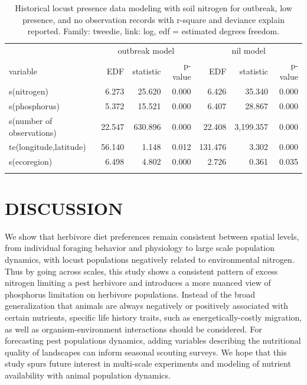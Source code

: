\documentclass[
]{article}
\begin{document}
\begingroup
\fontsize{12.0pt}{14.4pt}\selectfont

\begin{longtable}{lrrrrrr}

\toprule
 & \multicolumn{3}{c}{outbreak model} & \multicolumn{3}{c}{nil model} \\ 
\cmidrule(lr){2-4} \cmidrule(lr){5-7}
variable & EDF & statistic & p-value & EDF & statistic & p-value \\ 
\midrule\addlinespace[2.5pt]
s(nitrogen) & 6.273 & 25.620 & 0.000 & 6.426 & 35.340 & 0.000 \\ 
s(phosphorus) & 5.372 & 15.521 & 0.000 & 6.407 & 28.867 & 0.000 \\ 
s(number of observations) & 22.547 & 630.896 & 0.000 & 22.408 & 3,199.357 & 0.000 \\ 
te(longitude,latitude) & 56.140 & 1.148 & 0.012 & 131.476 & 3.302 & 0.000 \\ 
s(ecoregion) & 6.498 & 4.802 & 0.000 & 2.726 & 0.361 & 0.035 \\ 
\bottomrule

\caption{\label{tbl-spatial-modeling-outbreak-model-results}Historical
locust presence data modeling with soil nitrogen for outbreak, low
presence, and no observation records with r-square and deviance explain
reported. Family: tweedie, link: log, edf = estimated degrees freedom.}

\tabularnewline

\end{longtable}

\endgroup

\section{DISCUSSION}\label{discussion}

We show that herbivore diet preferences remain consistent between
spatial levels, from individual foraging behavior and physiology to
large scale population dynamics, with locust populations negatively
related to environmental nitrogen. Thus by going across scales, this
study shows a consistent pattern of excess nitrogen limiting a pest
herbivore and introduces a more nuanced view of phosphorus limitation on
herbivore populations. Instead of the broad generalization that animals
are always negatively or positively associated with certain nutrients,
specific life history traits, such as energetically-costly migration, as
well as organism-environment interactions should be considered. For
forecasting pest populations dynamics, adding variables describing the
nutritional quality of landscapes can inform seasonal scouting surveys.
We hope that this study spurs future interest in multi-scale experiments
and modeling of nutrient availability with animal population dynamics.
\end{document}
